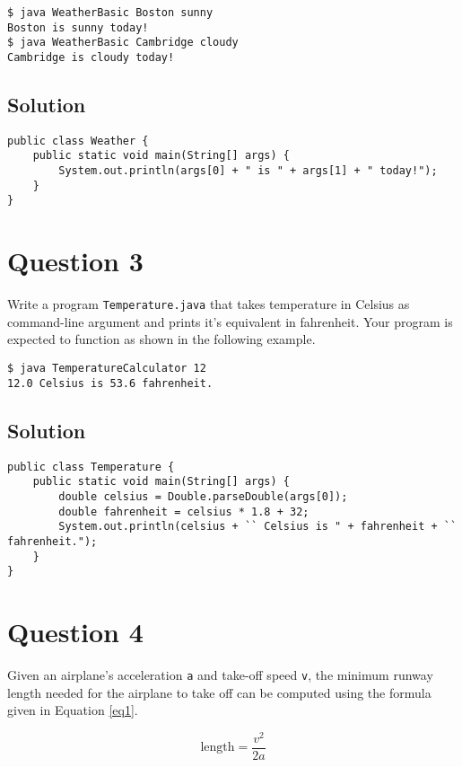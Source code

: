 \begin{verbatim}
$ java WeatherBasic Boston sunny
Boston is sunny today!
$ java WeatherBasic Cambridge cloudy
Cambridge is cloudy today!
\end{verbatim}

\subsection*{Solution}
\lstset{language=Java,tabsize=2}
\begin{lstlisting}
public class Weather {
	public static void main(String[] args) {
		System.out.println(args[0] + " is " + args[1] + " today!");
	}
}
\end{lstlisting}

\section*{Question 3}
Write a program \texttt{Temperature.java} that takes temperature in Celsius as command-line argument and prints it's equivalent in fahrenheit. Your program is expected to function as shown in the following example.

\begin{verbatim}
$ java TemperatureCalculator 12
12.0 Celsius is 53.6 fahrenheit.
\end{verbatim}

\subsection*{Solution}
\lstset{language=Java,tabsize=2}
\begin{lstlisting}
public class Temperature {
	public static void main(String[] args) {
		double celsius = Double.parseDouble(args[0]);
		double fahrenheit = celsius * 1.8 + 32;
		System.out.println(celsius + `` Celsius is " + fahrenheit + `` fahrenheit.");
	}
}
\end{lstlisting}

\section*{Question 4}
Given an airplane's acceleration \texttt{a} and take-off speed \texttt{v}, the minimum runway length needed for the airplane to take off can be computed using the formula given in Equation \ref{eq1}.

\begin{equation}
\textrm{length} = \frac{v^2}{2a}
\label{eq1}
\end{equation}

